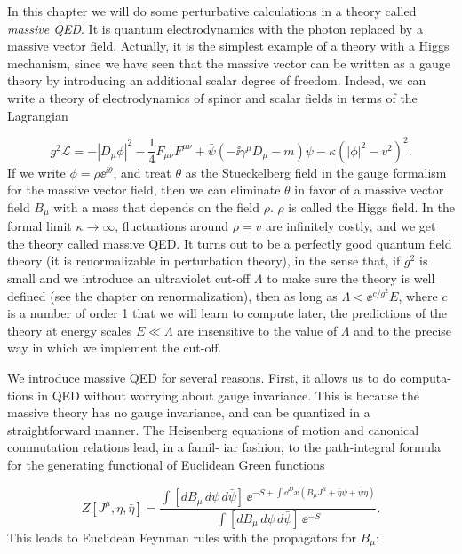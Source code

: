 
In this chapter we will do some perturbative calculations in a theory called \emph{massive
QED}. It is quantum electrodynamics with the photon replaced by a massive vector
field. Actually, it is the simplest example of a theory with a Higgs mechanism, since we
have seen that the massive vector can be written as a gauge theory by introducing an
additional scalar degree of freedom. Indeed, we can write a theory of electrodynamics
of spinor and scalar fields in terms of the Lagrangian

\begin{equation}
  g^2\mathcal{L}=-|D_\mu\phi|^2-\frac14F_{\mu\nu}F^{\mu\nu}
  +\bar\psi(-\ii\gamma^\mu D_\mu-m)\psi-\kappa(|\phi|^2-v^2)^2.
  \label{eq:6.1}
\end{equation}
If we write $\phi=\rho\ee^{\ii\theta}$, and treat $\theta$ as the Stueckelberg field in the gauge formalism for the
massive vector field, then we can eliminate $\theta$ in favor of a massive vector field $B_\mu$ with a
mass that depends on the field $\rho$. $\rho$ is called the Higgs field. In the formal limit $\kappa\to\infty$,
fluctuations around $\rho=v$ are infinitely costly, and we get the theory called massive
QED. It turns out to be a perfectly good quantum field theory (it is renormalizable in
perturbation theory), in the sense that, if $g^2$ is small and we introduce an ultraviolet
cut-off $\Lambda$ to make sure the theory is well defined (see the chapter on renormalization),
then as long as $\Lambda<\ee^{c/g^2}E$, where $c$ is a number of order 1 that we will learn to compute
later, the predictions of the theory at energy scales $E\ll\Lambda$ are insensitive to the value
of $\Lambda$ and to the precise way in which we implement the cut-off.

We introduce massive QED for several reasons. First, it allows us to do computa-
tions in QED without worrying about gauge invariance. This is because the massive
theory has no gauge invariance, and can be quantized in a straightforward manner. The
Heisenberg equations of motion and canonical commutation relations lead, in a famil-
iar fashion, to the path-integral formula for the generating functional of Euclidean
Green functions

\begin{equation}
  Z[J^\mu,\eta,\bar\eta]
  =\frac{\int[dB_\mu\,d\psi\,d\bar\psi]\,
  \ee^{-S+\int\dd^D x(B_\mu J^\mu+\bar\eta\psi+\bar\psi\eta)}}
  {\int[dB_\mu\,d\psi\,d\bar\psi]\,\ee^{-S}}.
  \label{eq:6.2}
\end{equation}
This leads to Euclidean Feynman rules with the propagators for $B_\mu$:

